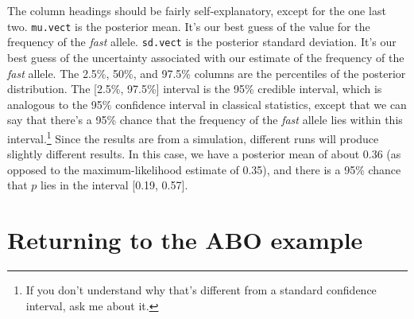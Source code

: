 The column headings should be fairly self-explanatory, except for the
one last two. {\tt mu.vect} is the posterior mean. It's our best guess of
the value for the frequency of the {\it fast\/} allele. {\tt sd.vect} is
the posterior standard deviation. It's our best guess of the
uncertainty associated with our estimate of the frequency of the {\it
  fast\/} allele. The 2.5\%, 50\%, and 97.5\% columns are the
percentiles of the posterior distribution. The [2.5\%, 97.5\%]
interval is the 95\% credible interval, which is analogous to the 95\%
confidence interval in classical statistics, except that we can say
that there's a 95\% chance that the frequency of the {\it fast\/}
allele lies within this interval.\footnote{If you don't understand why
  that's different from a standard confidence interval, ask me about
  it.} Since the results are from a simulation, different runs will
produce slightly different results. In this case, we have a posterior
mean of about 0.36 (as opposed to the maximum-likelihood estimate of
0.35), and there is a 95\% chance that $p$ lies in the interval [0.19,
0.57].

\section*{Returning to the ABO example}

